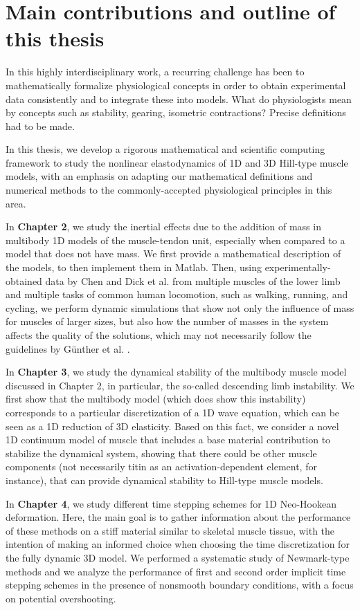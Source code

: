 \documentclass{sfuthesis}
\numberwithin{equation}{section}
\numberwithin{figure}{chapter}
\numberwithin{table}{chapter}
\theoremstyle{definition}
\begin{document}
\section{Main contributions and outline of this thesis}

In this highly interdisciplinary work, a recurring challenge has been to mathematically formalize physiological concepts in order to obtain experimental data consistently and to integrate these into models. What do physiologists mean by concepts such as stability, gearing, isometric contractions? Precise definitions had to be made.

In this thesis, we develop a rigorous mathematical and scientific computing framework to study the nonlinear elastodynamics of 1D and 3D Hill-type muscle models, with an emphasis on adapting our mathematical definitions and numerical methods to the commonly-accepted physiological principles in this area. 

In \textbf{Chapter 2}, we study the inertial effects due to the addition of mass in multibody 1D models of the muscle-tendon unit, especially when compared to a model that does not have mass. We first provide a mathematical description of the models, to then implement them in Matlab. Then, using experimentally-obtained data by Chen \cite{EvanThesis} and Dick et al. \cite{Dick2016} from multiple muscles of the lower limb and multiple tasks of common human locomotion, such as walking, running, and cycling, we perform dynamic simulations that show not only the influence of mass for muscles of larger sizes, but also how the number of masses in the system affects the quality of the solutions, which may not necessarily follow the guidelines by G\"{u}nther et al. \cite{Gunther2012}.

In \textbf{Chapter 3}, we study the dynamical stability of the multibody muscle model discussed in Chapter 2, in particular, the so-called descending limb instability. We first show that the multibody model (which does show this instability) corresponds to a particular discretization of a 1D wave equation, which can be seen as a 1D reduction of 3D elasticity. Based on this fact, we consider a novel 1D continuum model of muscle that includes a base material contribution to stabilize the dynamical system, showing that there could be other muscle components (not necessarily titin as an activation-dependent element, for instance), that can provide dynamical stability to Hill-type muscle models.

In \textbf{Chapter 4}, we study different time stepping schemes for 1D Neo-Hookean deformation. Here, the main goal is to gather information about the performance of these methods on a stiff material similar to skeletal muscle tissue, with the intention of making an informed choice when choosing the time discretization for the fully dynamic 3D model. We performed a systematic study of Newmark-type methods and we analyze the performance of first and second order implicit time stepping schemes in the presence of nonsmooth boundary conditions, with a focus on potential overshooting.
\end{document}
